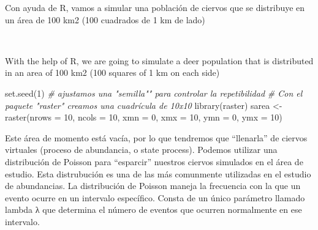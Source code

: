 \documentclass[
]{book}
\newenvironment{Shaded}{\begin{snugshade}}{\end{snugshade}}
\newcommand{\AttributeTok}[1]{\textcolor[rgb]{0.77,0.63,0.00}{#1}}
\newcommand{\CommentTok}[1]{\textcolor[rgb]{0.56,0.35,0.01}{\textit{#1}}}
\newcommand{\DecValTok}[1]{\textcolor[rgb]{0.00,0.00,0.81}{#1}}
\newcommand{\FunctionTok}[1]{\textcolor[rgb]{0.00,0.00,0.00}{#1}}
\newcommand{\NormalTok}[1]{#1}
\newcommand{\OtherTok}[1]{\textcolor[rgb]{0.56,0.35,0.01}{#1}}
\begin{document}
\begin{col}{0.45\textwidth}
Con ayuda de R, vamos a simular una población de ciervos que se distribuye en un área de 100 km2 (100 cuadrados de 1 km de lado)

\end{col}

\begin{col}{0.05\textwidth}
~

\end{col}

\begin{col}{0.45\textwidth}
With the help of R, we are going to simulate a deer population that is distributed in an area of 100 km2 (100 squares of 1 km on each side)

\end{col}

\begin{Shaded}
\begin{Highlighting}[]
\FunctionTok{set.seed}\NormalTok{(}\DecValTok{1}\NormalTok{) }\CommentTok{\# ajustamos una "semilla"" para controlar la repetibilidad }
\CommentTok{\# Con el paquete "raster" creamos una cuadrícula de 10x10}
\FunctionTok{library}\NormalTok{(raster)}
\NormalTok{sarea }\OtherTok{\textless{}{-}} \FunctionTok{raster}\NormalTok{(}\AttributeTok{nrows =} \DecValTok{10}\NormalTok{, }\AttributeTok{ncols =} \DecValTok{10}\NormalTok{, }\AttributeTok{xmn =} \DecValTok{0}\NormalTok{, }\AttributeTok{xmx =} \DecValTok{10}\NormalTok{, }\AttributeTok{ymn =} \DecValTok{0}\NormalTok{, }\AttributeTok{ymx =} \DecValTok{10}\NormalTok{)}
\end{Highlighting}
\end{Shaded}

\begin{col}{0.45\textwidth}
Este área de momento está vacía, por lo que tendremos que ``llenarla'' de ciervos virtuales (proceso de abundancia, o state process). Podemos utilizar una distribución de Poisson para ``esparcir'' nuestros ciervos simulados en el área de estudio. Esta distrubución es una de las más comunmente utilizadas en el estudio de abundancias. La distribución de Poisson maneja la frecuencia con la que un evento ocurre en un intervalo específico. Consta de un único parámetro llamado lambda λ que determina el número de eventos que ocurren normalmente en ese intervalo.

\end{col}

\begin{col}{0.05\textwidth}
~

\end{col}
\end{document}
